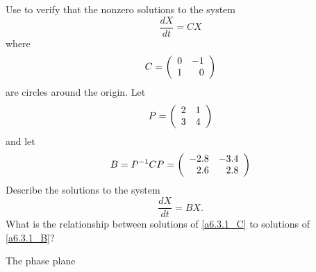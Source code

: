 \documentclass{ximera}
\begin{document}
\begin{exercise} \label{a6.3.1}
Use {\pplane} to verify that the nonzero solutions to the system
\[
\frac{dX}{dt} = CX
\]
where
\begin{equation} \label{a6.3.1_C}
C = \left(\begin{array}{rrrrrrrrrrrrrrrrrr} 0 & -1\\ 1 & 0 \end{array}\right)
\end{equation}
are circles around the origin.  Let 
\[
P = \left(\begin{array}{rrrrrrrrrrrrrrrrrr} 2 & 1\\ 3 & 4 \end{array}\right)
\]
and  let 
\[
B = P^{-1}CP =  \left(\begin{array}{rrrrrrrrrrrrrrrrrr} -2.8 & -3.4\\ 2.6 & 2.8 \end{array}\right)
\]
Describe the solutions to the system
\begin{equation} \label{a6.3.1_B}
\frac{dX}{dt} = BX.
\end{equation}
What is the relationship between solutions of \eqref{a6.3.1_C} to solutions of \eqref{a6.3.1_B}?

\begin{solution}
\soln 

The phase plane 

\begin{figure}[htb]
                       \centerline{%
                       }
\end{figure}

\end{solution}
\end{exercise}
\end{document}

